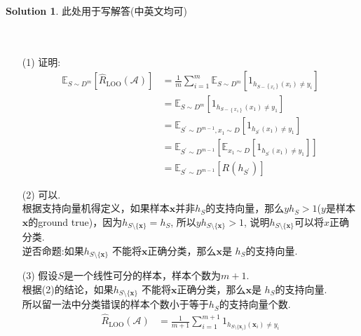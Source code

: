 \documentclass[a4paper,UTF8]{article}
\numberwithin{equation}{section}
\theoremstyle{definition}
\newtheorem*{solution}{Solution}
\def \x {\boldsymbol{x}}
\begin{document}
\begin{solution}
	此处用于写解答(中英文均可)
	~\\
	~\\
	~\\
    \begin{enumerate}
        \item [(1)]
        证明:
        \begin{equation}
            \begin{aligned} \mathbb{E}_{S \sim D^{m}}[\hat{R}_{\mathrm{LOO}}(\mathcal{A})] & =\frac{1}{m} \sum_{i=1}^{m} \mathbb{E}_{S \sim D^{m}}\left[1_{h_{S-\left\{x_{i}\right\}}\left(x_{i}\right) \neq y_{i}}\right] \\ & =\mathbb{E}_{S \sim D ^m}\left[1_{h_{S-\left\{x_{1}\right\}}\left(x_{1}\right) \neq y_{1}}\right] \\ & =\mathbb{E}_{S^{\prime} \sim D^{m-1}, x_{1} \sim D}\left[1_{h_{S^{\prime}}\left(x_{1}\right) \neq y_{1}}\right] \\ & =\mathbb{E}_{S^{\prime} \sim D^{m-1}}\left[\mathbb{E}_{x_{1} \sim D}\left[1_{h_{S^{\prime}}\left(x_{1}\right) \neq y_{1}}\right]\right] \\ & =\mathbb{E}_{S^{\prime} \sim D^{m-1}}\left[R\left(h_{S^{\prime}}\right)\right] \end{aligned} \label{2}
        \end{equation}
        \item [(2)]
        可以.\\
        根据支持向量机得定义，如果样本$\x$并非$h_S$的支持向量，那么$yh_S>1$($y$是样本$\x$的ground true)，因为$h_{S \setminus \{\x\}} = h_S$,
        所以$yh_{S \setminus \{\x\}} > 1$, 说明$h_{S \setminus \{\x\}}$可以将$x$正确分类. \\
        逆否命题:如果$h_{S \setminus \{\x\}}$ 不能将$\x$正确分类，那么$\x$是 $h_S$的支持向量.
        \item [(3)]
        假设$S$是一个线性可分的样本，样本个数为$m+1$. \\
        根据(2)的结论，如果$h_{S \setminus \{\x\}}$ 不能将$\x$正确分类，那么$\x$是 $h_S$的支持向量.\\
        所以留一法中分类错误的样本个数小于等于$h_S$的支持向量个数. \\
        \begin{equation}
            \begin{aligned}
                \hat R_{\text{LOO}}(\mathcal{A}) &= \frac{1}{m+1} \sum_{i=1}^{m+1} \mathrm{1}_{h_{S \setminus \{\x_i\}}(\x_i) \neq y_i} \\

\end{aligned}
\end{equation}
\end{enumerate}
\end{solution}
\end{document}
